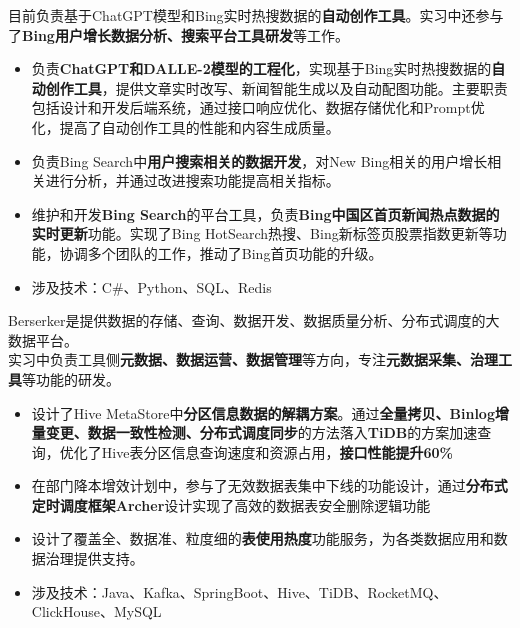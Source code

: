 \documentclass{resume}
\begin{document}
目前负责基于ChatGPT模型和Bing实时热搜数据的\textbf{自动创作工具}。实习中还参与了\textbf{Bing用户增长数据分析、搜索平台工具研发}等工作。
\begin{itemize}
  \item 负责\textbf{ChatGPT和DALLE-2模型的工程化}，实现基于Bing实时热搜数据的\textbf{自动创作工具}，提供文章实时改写、新闻智能生成以及自动配图功能。主要职责包括设计和开发后端系统，通过接口响应优化、数据存储优化和Prompt优化，提高了自动创作工具的性能和内容生成质量。
  \item 负责Bing Search中\textbf{用户搜索相关的数据开发}，对New Bing相关的用户增长相关进行分析，并通过改进搜索功能提高相关指标。
  \item 维护和开发\textbf{Bing Search}的平台工具，负责\textbf{Bing中国区首页新闻热点数据的实时更新}功能。实现了Bing HotSearch热搜、Bing新标签页股票指数更新等功能，协调多个团队的工作，推动了Bing首页功能的升级。
  \item 涉及技术：C\#、Python、SQL、Redis
\end{itemize}

Berserker是提供数据的存储、查询、数据开发、数据质量分析、分布式调度的大数据平台。\\
实习中负责工具侧\textbf{元数据、数据运营、数据管理}等方向，专注\textbf{元数据采集、治理工具}等功能的研发。
\begin{itemize}
  \item 设计了Hive MetaStore中\textbf{分区信息数据的解耦方案}。通过\textbf{全量拷贝、Binlog增量变更、数据一致性检测、分布式调度同步}的方法落入\textbf{TiDB}的方案加速查询，优化了Hive表分区信息查询速度和资源占用，\textbf{接口性能提升60\%}
  \item 在部门降本增效计划中，参与了无效数据表集中下线的功能设计，通过\textbf{分布式定时调度框架Archer}设计实现了高效的数据表安全删除逻辑功能
  \item 设计了覆盖全、数据准、粒度细的\textbf{表使用热度}功能服务，为各类数据应用和数据治理提供支持。
  \item 涉及技术：Java、Kafka、SpringBoot、Hive、TiDB、RocketMQ、ClickHouse、MySQL
\end{itemize}
\end{document}
